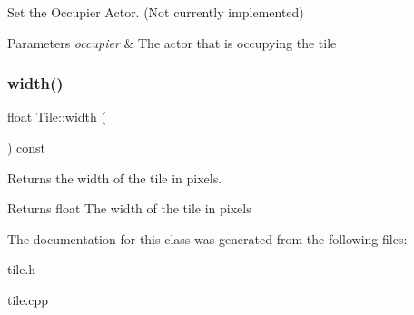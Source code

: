 Set the Occupier Actor. (Not currently implemented) 


\begin{DoxyParams}{Parameters}
{\em occupier} & The actor that is occupying the tile \\
\hline
\end{DoxyParams}
\mbox{\label{classRose_1_1Tile_a819194106af71d48f48d0fedfcccc31e}} 
\subsubsection{\texorpdfstring{width()}{width()}}
{\footnotesize\ttfamily float Tile\+::width (\begin{DoxyParamCaption}{ }\end{DoxyParamCaption}) const}



Returns the width of the tile in pixels. 

\begin{DoxyReturn}{Returns}
float The width of the tile in pixels 
\end{DoxyReturn}


The documentation for this class was generated from the following files\+:\begin{DoxyCompactItemize}
\item 
tile.\+h\item 
tile.\+cpp\end{DoxyCompactItemize}
